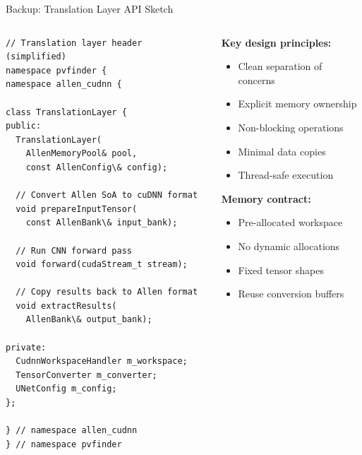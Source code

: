 \documentclass[10pt,aspectratio=169]{beamer}
\begin{document}
\begin{frame}{Backup: Translation Layer API Sketch}
  \begin{columns}[T]
    \begin{column}{0.55\textwidth}
      \small
\begin{verbatim}
// Translation layer header (simplified)
namespace pvfinder {
namespace allen_cudnn {

class TranslationLayer {
public:
  TranslationLayer(
    AllenMemoryPool& pool,
    const AllenConfig\& config);
    
  // Convert Allen SoA to cuDNN format
  void prepareInputTensor(
    const AllenBank\& input_bank);
    
  // Run CNN forward pass
  void forward(cudaStream_t stream);
    
  // Copy results back to Allen format
  void extractResults(
    AllenBank\& output_bank);

private:
  CudnnWorkspaceHandler m_workspace;
  TensorConverter m_converter;
  UNetConfig m_config;
};

} // namespace allen_cudnn
} // namespace pvfinder
\end{verbatim}
    \end{column}

    \begin{column}{0.45\textwidth}
      \textbf{Key design principles:}

      \begin{itemize}
        \item Clean separation of concerns
        \item Explicit memory ownership
        \item Non-blocking operations
        \item Minimal data copies
        \item Thread-safe execution
      \end{itemize}

      \textbf{Memory contract:}
      \begin{itemize}
        \item Pre-allocated workspace
        \item No dynamic allocations
        \item Fixed tensor shapes
        \item Reuse conversion buffers
      \end{itemize}
    \end{column}
  \end{columns}
\end{frame}
\end{document}
